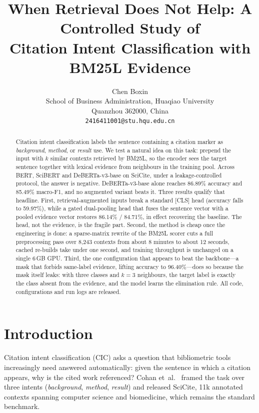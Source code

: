 \documentclass[10pt,twocolumn,twoside]{article}
\title{When Retrieval Does Not Help: A Controlled Study of\\
       Citation Intent Classification with BM25L Evidence}
\author{
Chen Boxin\\
School of Business Administration, Huaqiao University\\
Quanzhou 362000, China\\
\texttt{2416411001@stu.hqu.edu.cn}
}
\makeatletter
\def\maketitle{%
\twocolumn[{%
\thispagestyle{empty}%
\begin{center}%
  \let\footnote\thanks
  {\LARGE \bfseries \@title\par}%
  \vskip 0.4em%
  {\large\lineskip .5em%
   \begin{tabular}[t]{c}\@author\end{tabular}\par}%
  \vskip 0.5em%
\end{center}%
\vskip 1em%
}]%
}%
\makeatother
\begin{document}
\maketitle

\begin{abstract}
Citation intent classification labels the sentence containing a citation
marker as \emph{background}, \emph{method}, or \emph{result} use. We test a
natural idea on this task: prepend the input with $k$ similar contexts
retrieved by BM25L, so the encoder sees the target sentence together with
lexical evidence from neighbours in the training pool. Across BERT, SciBERT and
DeBERTa-v3-base on SciCite, under a leakage-controlled protocol, the answer is
negative. DeBERTa-v3-base alone reaches 86.89\% accuracy and 85.49\% macro-F1,
and no augmented variant beats it. Three results qualify that headline. First,
retrieval-augmented inputs break a standard \mbox{[CLS]} head (accuracy falls
to 59.97\%), while a gated dual-pooling head that fuses the sentence vector
with a pooled evidence vector restores 86.14\% / 84.71\%, in effect recovering
the baseline. The head, not the evidence, is the fragile part. Second, the
method is cheap once the engineering is done: a sparse-matrix rewrite of the
BM25L scorer cuts a full preprocessing pass over 8{,}243 contexts from about
8 minutes to about 12 seconds, cached re-builds take under one second, and
training throughput is unchanged on a single 6\,GB GPU. Third, the one
configuration that appears to beat the backbone---a mask that forbids
same-label evidence, lifting accuracy to 96.40\%---does so because the mask
itself leaks: with three classes and $k{=}3$ neighbours, the target label is
exactly the class absent from the evidence, and the model learns the
elimination rule. All code,
configurations and run logs are released.
\end{abstract}

\section{Introduction}\label{sec:intro}

Citation intent classification (CIC) asks a question that bibliometric tools
increasingly need answered automatically: given the sentence in which a
citation appears, why is the cited work referenced? Cohan et~al.~\cite{cohan2019}
framed the task over three intents (\emph{background}, \emph{method},
\emph{result}) and released SciCite, 11k annotated contexts spanning computer
science and biomedicine, which remains the standard benchmark.
\end{document}
